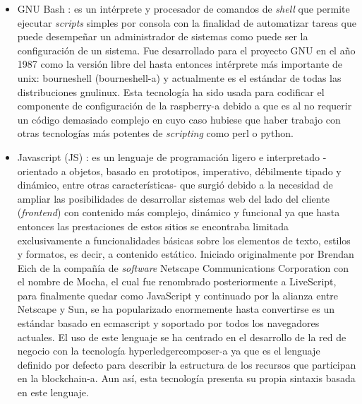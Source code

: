\documentclass[12pt,a4paper, twoside]{report}
\begin{document}
	\begin{itemize}
		\item GNU Bash \cite{bash}: es un intérprete y procesador de comandos de \textit{\gls{shell}} que permite ejecutar \textit{\glspl{script}} simples por consola con la finalidad de automatizar tareas que puede desempeñar un administrador de sistemas como puede ser la configuración de un sistema. Fue desarrollado para el proyecto GNU en el año 1987 como la versión libre del hasta entonces intérprete más importante de \gls{unix}: \gls{bourneshell} (\gls{bourneshell-a}) y actualmente es el estándar de todas las distribuciones \gls{gnulinux}. Esta tecnología ha sido usada para codificar el componente de configuración de la \gls{raspberry-a} debido a que es al no requerir un código demasiado complejo en cuyo caso hubiese que haber trabajo con otras tecnologías más potentes de \textit{scripting} como \gls{perl} o \gls{python}.
	
		\item Javascript (JS) \cite{javascript}: es un  lenguaje de programación ligero e interpretado -orientado a objetos, basado en prototipos, imperativo, débilmente tipado y dinámico, entre otras características- que surgió debido a la necesidad de ampliar las posibilidades de desarrollar sistemas web del lado del cliente (\textit{\gls{frontend}}) con contenido más complejo, dinámico y funcional ya que hasta entonces las prestaciones de estos sitios se encontraba limitada exclusivamente a funcionalidades básicas sobre los elementos de texto, estilos y formatos, es decir, a contenido estático. Iniciado originalmente por Brendan Eich de la compañía de \textit{software} Netscape Communications Corporation con el nombre de Mocha, el cual fue renombrado posteriormente a LiveScript, para finalmente quedar como JavaScript y continuado por la alianza entre Netscape y Sun, se ha popularizado enormemente hasta convertirse es un estándar basado en \gls{ecmascript} y soportado por todos los navegadores actuales. El uso de este lenguaje se ha centrado en el desarrollo de la red de negocio con la tecnología \gls{hyperledgercomposer-a} ya que es el lenguaje definido por defecto para describir la estructura de los recursos que participan en la \gls{blockchain-a}. Aun así, esta tecnología presenta su propia sintaxis basada en este lenguaje.
		

\end{itemize}
\end{document}
